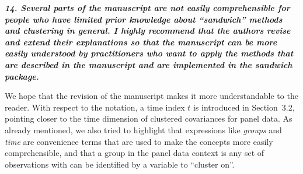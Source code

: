 \documentclass[10pt,a4paper]{article}
\begin{document}
\medskip

\textbf{\textit{14. Several parts of the manuscript are not easily comprehensible for people who have limited
prior knowledge about ``sandwich'' methods and clustering in general. I highly recommend
that the authors revise and extend their explanations so that the manuscript can be more
easily understood by practitioners who want to apply the methods that are described in
the manuscript and are implemented in the sandwich package.}}

\medskip

We hope that the revision of the manuscript makes it more understandable to the reader.
With respect to the notation, a time index $t$ is introduced in Section~3.2, pointing closer to the time dimension of clustered covariances for panel data.  
As already mentioned, we also tried to highlight that expressions like \emph{groups} and \emph{time} are convenience terms that are used to make the concepts more easily comprehensible, and that a group in the panel data context is any set of observations with can be identified by a variable to ``cluster on''. 
\end{document}
